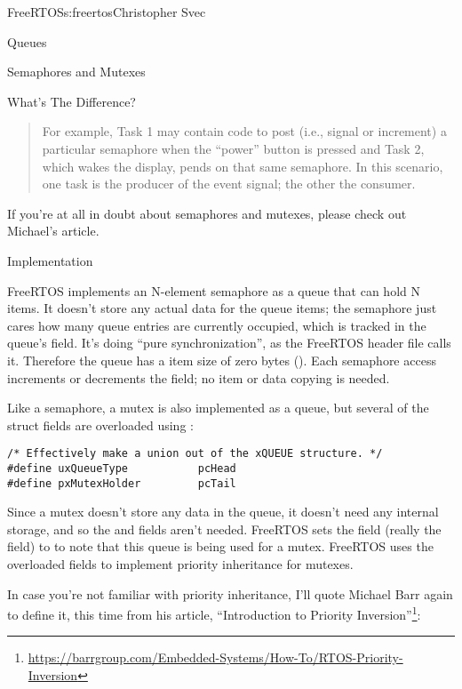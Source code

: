 \begin{aosachapter}{FreeRTOS}{s:freertos}{Christopher Svec}
\begin{aosasect1}{Queues}
\begin{aosasect2}{Semaphores and Mutexes}
\begin{aosasect3}{What's The Difference?}
\begin{quotation}
\noindent For example, Task 1 may contain code to post (i.e., signal or increment) a 
particular semaphore when the ``power'' button is pressed and Task 2, which wakes the 
display, pends on that same semaphore. In this scenario, one task is the producer of 
the event signal; the other the consumer.
\end{quotation}

\noindent If you're at all in doubt about semaphores and mutexes, please check
out Michael's article.

\end{aosasect3}

\begin{aosasect3}{Implementation}

FreeRTOS implements an N-element semaphore as a queue that can hold N
items. It doesn't store any actual data for the queue items; the
semaphore just cares how many queue entries are currently occupied,
which is tracked in the queue's  field.  It's
doing ``pure synchronization'', as the FreeRTOS header file
 calls it.  Therefore the queue has a item size of zero
bytes ().  Each semaphore access increments or
decrements the  field; no item or data copying
is needed.

Like a semaphore, a mutex is also implemented as a queue, but several
of the  struct fields are overloaded using
:

\begin{verbatim}
/* Effectively make a union out of the xQUEUE structure. */
#define uxQueueType           pcHead
#define pxMutexHolder         pcTail
\end{verbatim}

Since a mutex doesn't store any data in the queue, it doesn't need any
internal storage, and so the  and  fields
aren't needed.  FreeRTOS sets the  field (really the
 field) to  to note that this queue is being used for a
mutex.  FreeRTOS uses the overloaded  fields to implement
priority inheritance for mutexes.

In case you're not familiar with priority inheritance, I'll quote
Michael Barr again to define it, this time from his article,
``Introduction to Priority
Inversion''\footnote{\url{https://barrgroup.com/Embedded-Systems/How-To/RTOS-Priority-Inversion}}:


\end{aosasect3}
\end{aosasect2}
\end{aosasect1}
\end{aosachapter}
